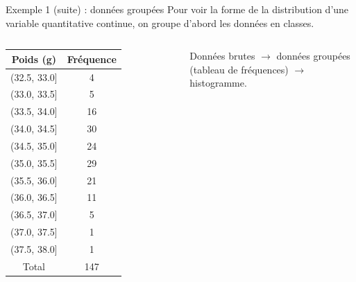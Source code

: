 \documentclass{BeamerTemplate}
\begin{document}
\begin{frame}[t]{Exemple 1 (suite) : données groupées}
  Pour voir la \alert{forme} de la distribution d'une variable quantitative
  continue, on \alert{groupe} d'abord les données en classes.

  \begin{columns}[T]
    \centering\scriptsize
    \renewcommand{\arraystretch}{0.9}
    \begin{tabular}{cc}
      \toprule
      Poids (g) & Fréquence \\
      \midrule
      (32.5, 33.0] & 4 \\
      (33.0, 33.5] & 5 \\
      (33.5, 34.0] & 16 \\
      (34.0, 34.5] & 30 \\
      (34.5, 35.0] & 24 \\
      (35.0, 35.5] & 29 \\
      (35.5, 36.0] & 21 \\
      (36.0, 36.5] & 11 \\
      (36.5, 37.0] & 5 \\
      (37.0, 37.5] & 1 \\
      (37.5, 38.0] & 1 \\
      \midrule
      Total & 147 \\
      \bottomrule
    \end{tabular}

    \centering

    \small
    Données \alert{brutes} $\rightarrow$ données \alert{groupées}
    (tableau de fréquences) $\rightarrow$ \alert{histogramme}.

  \end{columns}
\end{frame}
\end{document}
